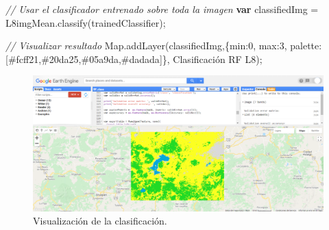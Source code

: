 \documentclass[
  12pt,
  letterpaper,
  twoside]{book}
\newenvironment{Shaded}{\begin{snugshade}}{\end{snugshade}}
\newcommand{\BuiltInTok}[1]{#1}
\newcommand{\CommentTok}[1]{\textcolor[rgb]{0.24,0.58,0.00}{\textit{#1}}}
\newcommand{\DataTypeTok}[1]{\textcolor[rgb]{0.00,0.00,0.00}{#1}}
\newcommand{\DecValTok}[1]{\textcolor[rgb]{0.28,0.53,0.93}{#1}}
\newcommand{\FunctionTok}[1]{\textcolor[rgb]{0.48,0.12,0.64}{#1}}
\newcommand{\KeywordTok}[1]{\textcolor[rgb]{0.00,0.00,0.00}{\textbf{#1}}}
\newcommand{\NormalTok}[1]{#1}
\newcommand{\OperatorTok}[1]{\textcolor[rgb]{0.00,0.00,0.00}{#1}}
\newcommand{\StringTok}[1]{\textcolor[rgb]{0.87,0.29,0.22}{#1}}
\begin{document}
\begin{Shaded}
\begin{Highlighting}[]
\CommentTok{// Usar el clasificador entrenado sobre toda la imagen}
\KeywordTok{var}\NormalTok{ classifiedImg }\OperatorTok{=}\NormalTok{ L8imgMean}\OperatorTok{.}\FunctionTok{classify}\NormalTok{(trainedClassifier)}\OperatorTok{;}

\CommentTok{// Visualizar resultado}
\BuiltInTok{Map}\OperatorTok{.}\FunctionTok{addLayer}\NormalTok{(classifiedImg}\OperatorTok{,}\NormalTok{\{}\DataTypeTok{min}\OperatorTok{:}\DecValTok{0}\OperatorTok{,} \DataTypeTok{max}\OperatorTok{:}\DecValTok{3}\OperatorTok{,} 
  \DataTypeTok{palette}\OperatorTok{:}\NormalTok{[}\StringTok{\textquotesingle{}\#fcff21\textquotesingle{}}\OperatorTok{,}\StringTok{\textquotesingle{}\#20da25\textquotesingle{}}\OperatorTok{,}\StringTok{\textquotesingle{}\#05a9da\textquotesingle{}}\OperatorTok{,}\StringTok{\textquotesingle{}\#dadada\textquotesingle{}}\NormalTok{]\}}\OperatorTok{,}
  \StringTok{\textquotesingle{}Clasificación RF L8\textquotesingle{}}\NormalTok{)}\OperatorTok{;}
\end{Highlighting}
\end{Shaded}

\begin{figure}[H]

{\centering \includegraphics[width=0.95\linewidth]{Img/RFClass} 

}

\caption{Visualización de la clasificación.}\label{fig:fc123}
\end{figure}
\end{document}
